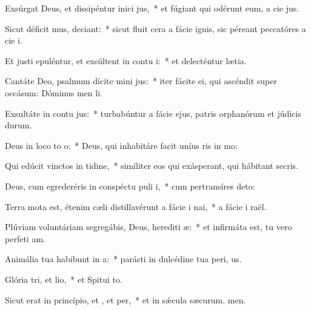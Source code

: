 \item Exsúrgat Deus, et dissipéntur inici jus,~* et fúgiant qui odérunt eum, a cie jus.
\item Sicut déficit mus, deciant:~* sicut fluit cera a fácie ignis, sic péreant peccatóres a cie i.
\item Et justi epuléntur, et exsúltent in contu i:~* et delecténtur  lætia.
\item Cantáte Deo, psalmum dícite mini jus:~* iter fácite ei, qui ascéndit super occásum: Dóminus men li.
\item Exsultáte in contu jus:~* turbabúntur a fácie ejus, patris orphanórum et júdicis durum.
\item Deus in loco to o:~* Deus, qui inhabitáre facit uníus ris in mo:
\item Qui edúcit vinctos in tidine,~* simíliter eos qui exásperant, qui hábitant  secris.
\item Deus, cum egrederéris in conspéctu puli i,~* cum pertransíres  deto:
\item Terra mota est, étenim cæli distillavérunt a fácie i nai,~* a fácie i raël.
\item Plúviam voluntáriam segregábis, Deus, herediti æ:~* et infirmáta est, tu vero perfeti am.
\item Animália tua habibunt in a:~* parásti in dulcédine tua peri, us.
\item Glória tri, et lio,~* et Spitui to.
\item Sicut erat in princípio, et , et per,~* et in sǽcula sæcurum. men.
